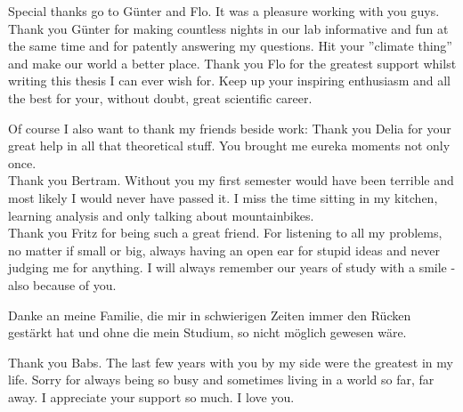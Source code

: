 \documentclass[parskip,12pt,headsepline,a4paper] {scrbook}
\begin{document}
Special thanks go to G\"unter and Flo. It was a pleasure working with you guys. Thank you G\"unter for making countless nights in our lab informative and fun at the same time and for patently answering my questions. Hit your ''climate thing'' and make our world a better place. Thank you Flo for the greatest support whilst writing this thesis I can ever wish for. Keep up your inspiring enthusiasm and all the best for your, without doubt, great scientific career.

Of course I also want to thank my friends beside work: Thank you Delia for your great help in all that theoretical stuff. You brought me eureka moments not only once. \\
Thank you Bertram. Without you my first semester would have been terrible and most likely I would never have passed it. I miss the time sitting in my kitchen, learning analysis and only talking about mountainbikes. \\
Thank you Fritz for being such a great friend. For listening to all my problems, no matter if small or big, always having an open ear for stupid ideas and never judging me for anything. I will always remember our years of study with a smile - also because of you.

Danke an meine Familie, die mir in schwierigen Zeiten immer den R\"ucken gest\"arkt hat und ohne die mein Studium, so nicht m\"oglich gewesen w\"are.

Thank you Babs. The last few years with you by my side were the greatest in my life. Sorry for always being so busy and sometimes living in a world so far, far away. I appreciate your support so much. I love you.
\end{document}
